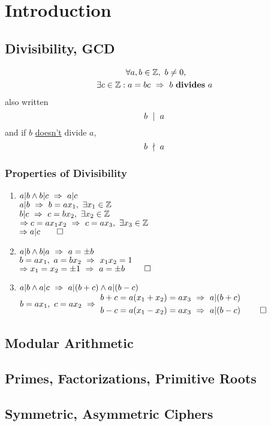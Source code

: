\chapter{Introduction}
\section{Divisibility, GCD}
\begin{definition}[Divisibility]
  \begin{gather*}
    \forall a,b \in \mathbb{Z}, \ b \ne 0,	\\
    \exists c \in \mathbb{Z} : a=bc \ \Rightarrow \  b \ \textbf{divides} \ a \ 
  \end{gather*}
  also written \[b \ \mid \ a \ \]
  and if $b$ \underline{doesn't} divide $a$, \[b \ \nmid \ a \ \]
\end{definition}
\subsection{Properties of Divisibility}
\begin{enumerate}
  \item
        $a|b \wedge b|c \ \Rightarrow \  a|c \ $	\\
        $a|b \ \Rightarrow \  b=ax_1, \ \exists x_1 \in \mathbb{Z} \ $	\\
        $b|c \ \Rightarrow \  c=bx_2, \ \exists x_2 \in \mathbb{Z} \ $	\\
        $\Rightarrow \ifthen{c=ax_1x_2}{c=ax_3, \ \exists x_3 \in \Z}$	\\
        $\Rightarrow a|c \qed$
  \item
        $a|b \wedge b|a \ \Rightarrow \  a=\pm b \ $	\\
        $\ifthen{b=ax_1, \ a=bx_2}{x_1x_2=1}$	\\
        $\Rightarrow x_1=x_2=\pm 1 \ \Rightarrow \  a=\pm b \  \qed$
  \item
        $a|b \wedge a|c \ \Rightarrow \  a|(b+c) \wedge a|(b-c) \ $  \\
        $b=ax_1, \ c=ax_2 \ \Rightarrow \  
            \begin{aligned}
              b+c & = a(x_1+x_2) = ax_3 \ \Rightarrow \  a|(b+c) \       \\
              b-c & = a(x_1-x_2) = ax_3 \ \Rightarrow \  a|(b-c) \  \qed
            \end{aligned}
           \ $
\end{enumerate}
\section{Modular Arithmetic}
\section{Primes, Factorizations, Primitive Roots}
\section{Symmetric, Asymmetric Ciphers}